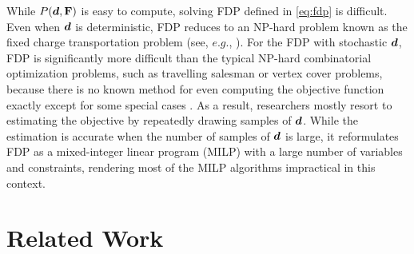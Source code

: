 \documentclass{article} %
\begin{document}
While $P(\boldsymbol{d}, \mathbf{F})$ is easy to compute, solving FDP defined in \eqref{eq:fdp} is difficult. Even when $\boldsymbol{d}$ is deterministic, FDP reduces to an NP-hard problem known as the fixed charge transportation problem (see, $e.g.$, \citet{agarwal2012fixed}). 
For the FDP with stochastic $\boldsymbol{d}$, FDP is significantly more difficult than the typical NP-hard combinatorial optimization problems, such as travelling salesman or vertex cover problems, because there is no known method for even computing the objective function exactly except for some special cases \citep{Chou2010}. As a result, researchers mostly resort to estimating the objective by repeatedly drawing samples of $\boldsymbol{d}$. While the estimation is accurate when the number of samples of $\boldsymbol{d}$ is large, it reformulates FDP as a mixed-integer linear program (MILP) with a large number of variables and constraints, rendering most of the MILP algorithms impractical in this context.




\section{Related Work}
\end{document}
